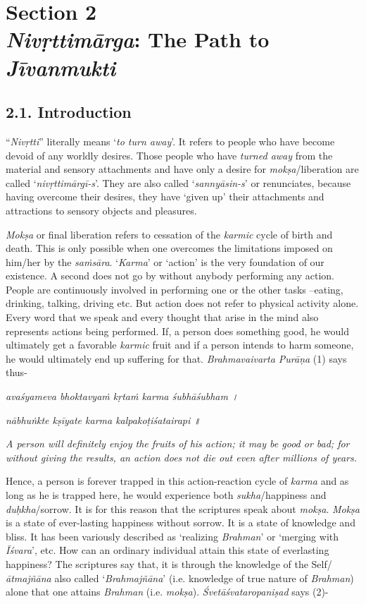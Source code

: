\chapter{\textbf{Section 2\\ \emph{Nivṛttimārga}: The Path to \emph{Jīvanmukti}}}

\section{2.1. Introduction}

``\emph{Nivṛtti}'' literally means `\emph{to turn away}'. It refers to people who have become devoid of any worldly desires. Those people who have \emph{turned away} from the material and sensory attachments and have only a desire for \emph{mokṣa}/liberation are called `\emph{nivṛttimārgī-s}'. They are also called `\emph{sannyāsin-s}' or renunciates, because having overcome their desires, they have `given up' their attachments and attractions to sensory objects and pleasures.

\emph{Mokṣa} or final liberation refers to cessation of the \emph{karmic} cycle of birth and death. This is only possible when one overcomes the limitations imposed on him/her by the \emph{saṁsāra}. `\emph{Karma}' or `action' is the very foundation of our existence. A second does not go by without anybody performing any action. People are continuously involved in performing one or the other tasks --eating, drinking, talking, driving etc. But action does not refer to physical activity alone. Every word that we speak and every thought that arise in the mind also represents actions being performed. If, a person does something good, he would ultimately get a favorable \emph{karmic} fruit and if a person intends to harm someone, he would ultimately end up suffering for that. \emph{Brahmavaivarta Purāṇa} (1) says thus-

\emph{avaśyameva bhoktavyaṁ kṛtaṁ karma śubhāśubham ।}

\emph{nābhuṅkte kṣīyate karma kalpakoṭiśatairapi ॥}

\emph{A person will definitely enjoy the fruits of his action; it may be good or bad; for without giving the results, an action does not die out even after millions of years.}

Hence, a person is forever trapped in this action-reaction cycle of \emph{karma} and as long as he is trapped here, he would experience both \emph{sukha}/happiness and \emph{duḥkha}/sorrow. It is for this reason that the scriptures speak about \emph{mokṣa}. \emph{Mokṣa} is a state of ever-lasting happiness without sorrow. It is a state of knowledge and bliss. It has been variously described as `realizing \emph{Brahman}' or `merging with \emph{Īśvara}', etc. How can an ordinary individual attain this state of everlasting happiness? The scriptures say that, it is through the knowledge of the Self/\emph{ātmajñāna} also called `\emph{Brahmajñāna}' (i.e. knowledge of true nature of \emph{Brahman}) alone that one attains \emph{Brahman} (i.e. \emph{mokṣa}). \emph{Śvetāśvataropaniṣad} says (2)-

